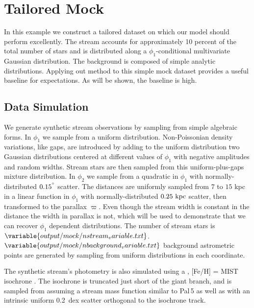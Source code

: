 \documentclass[twocolumn, linenumbers]{aastex631}
\newcommand{\stream}[1]{#1}
\newcommand{\parallax}{\varpi}
\begin{document}
\newpage
\section{Tailored Mock}\label{app:tailored_mock}

    In this example we construct a tailored dataset on which our model should perform excellently. The stream accounts for approximately 10 percent of the total number of stars and is distributed along a $\phi_1$-conditional multivariate Gaussian distribution. The background is composed of simple analytic distributions. Applying out method to this simple mock dataset provides a useful baseline for expectations. As will be shown, the baseline is high.

    \subsection{Data Simulation} \label{app:mock:data}

        We generate synthetic stream observations by sampling from simple
        algebraic forms.  In $\phi_1$ we sample from a uniform distribution.
        Non-Poissonian density variations, like gaps, are introduced by adding
        to the uniform distribution two Gaussian distributions centered at
        different values of $\phi_1$ with negative amplitudes and random widths.
        Stream stars are then sampled from this uniform-plus-gaps mixture
        distribution.  In $\phi_2$ we sample from a quadratic in $\phi_1$ with
        normally-distributed $0.15^{\degree}$ scatter.  The distances are
        uniformly sampled from $7$ to $15$ kpc in a linear function in $\phi_1$
        with normally-distributed $0.25 \ \rm{kpc}$ scatter, then transformed to
        the parallax $\parallax$. Even though the stream width is constant in
        the distance the width in parallax is not, which will be used to
        demonstrate that we can recover $\phi_1$ dependent distributions.  The
        number of stream stars is $\variable{output/mock/nstream_variable.txt}$.
        $\variable{output/mock/nbackground_variable.txt}$ background astrometric
        points are generated by sampling from uniform distributions in each
        coordinate.
    
        The synthetic stream's photometry is also simulated using a
        \unskip, [Fe/H] =
         MIST isochrone
        \citep[using][]{brutus}. The isochrone is truncated just short of the
        giant branch, and is sampled from assuming a stream mass function
        similar to \stream{Pal\,5} \citep{GrillmairSmith2001} as well as with an
        intrinsic uniform 0.2~dex scatter orthogonal to the isochrone track.
\end{document}
